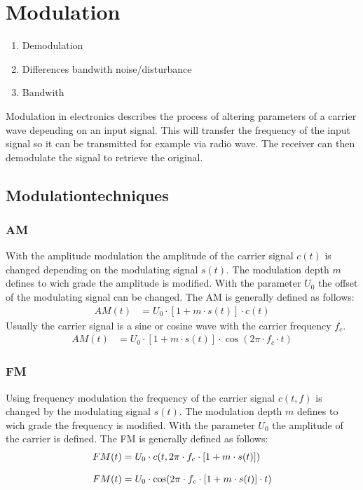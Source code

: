 \section{Modulation}\label{sec:theory:mod}

\begin{enumerate}
  \item Demodulation
  \item Differences
  \subitem bandwith
  \subitem noise/disturbance
  \item Bandwith
\end{enumerate}
%
Modulation in electronics describes the process of altering parameters of a carrier wave depending on an input signal. This will transfer the frequency of the input signal so it can be transmitted for example via radio wave. The receiver can then demodulate the signal to retrieve the original.

\subsection{Modulationtechniques}

\subsubsection*{AM}
With the amplitude modulation the amplitude of the carrier signal $c(t)$ is changed depending on the modulating signal $s(t)$. The modulation depth $m$ defines to wich grade the amplitude is modified. With the parameter $U_0$ the offset of the modulating signal can be changed.\p
The AM is generally defined as follows:
%
\begin{align}
  AM(t) &= U_0 \cdot [1 + m \cdot s(t)] \cdot c(t)
\end{align}
%
Usually the carrier signal is a sine or cosine wave with the carrier frequency $f_c$.
%
\begin{align}
  AM(t) &= U_0 \cdot [1 + m \cdot s(t)] \cdot \cos (2 \pi \cdot f_c \cdot t)\label{eq:theory:mod:am}
\end{align}
%
\subsubsection*{FM}
%
Using frequency modulation the frequency of the carrier signal $c(t, f)$ is changed by the modulating signal $s(t)$. The modulation depth $m$ defines to wich grade the frequency is modified. With the parameter $U_0$ the amplitude of the carrier is defined.\p
The FM is generally defined as follows:
%
\begin{align}
  FM(t) &= U_0 \cdot c(t, 2 \pi \cdot f_c \cdot [1 + m \cdot s(t)])\pmath
  FM(t) &= U_0 \cdot \cos (2 \pi \cdot f_c \cdot [1 + m \cdot s(t)] \cdot t) \label{eq:theory:mod:fm}
\end{align}

